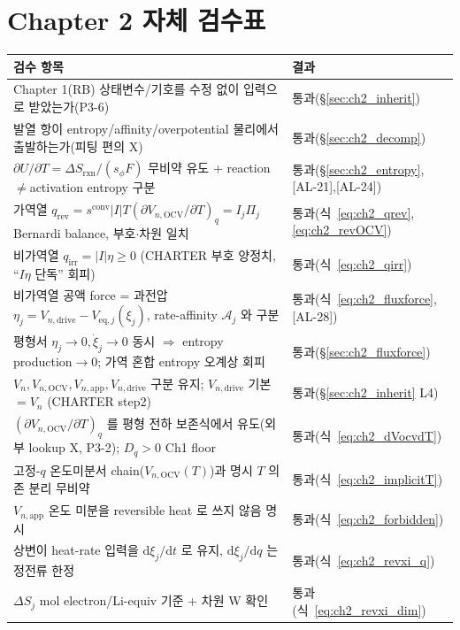 \documentclass[11pt,a4paper]{article}
\newcommand{\dd}{\mathrm{d}}
\newcommand{\eq}{\mathrm{eq}}
\newcommand{\app}{\mathrm{app}}
\newcommand{\drive}{\mathrm{drive}}
\newcommand{\OCV}{\mathrm{OCV}}
\newcommand{\irr}{\mathrm{irr}}
\newcommand{\rev}{\mathrm{rev}}
\newcommand{\rxn}{\mathrm{rxn}}
\newcommand{\conv}{\mathrm{conv}}
\newcommand{\AL}[1]{\textsf{[AL-#1]}}
\begin{document}
\section{Chapter 2 자체 검수표}\label{sec:ch2_selfcheck}
{\small
\begin{longtable}{p{} p{}}
\toprule 검수 항목 & 결과 \\ \midrule \endhead
Chapter 1(RB) 상태변수/기호를 수정 없이 입력으로 받았는가(P3-6) & 통과(\S\ref{sec:ch2_inherit}) \\
발열 항이 entropy/affinity/overpotential 물리에서 출발하는가(피팅 편의 X) & 통과(\S\ref{sec:ch2_decomp}) \\
$\partial U/\partial T=\Delta S_\rxn/(s_\phi F)$ 무비약 유도 + reaction$\ne$activation entropy 구분 & 통과(\S\ref{sec:ch2_entropy}, \AL{21},\AL{24}) \\
가역열 $q_\rev=s^\conv|I|T(\partial V_{n,\OCV}/\partial T)_q=I_j\Pi_j$ Bernardi balance, 부호$\cdot$차원 일치 & 통과(식~\eqref{eq:ch2_qrev},\eqref{eq:ch2_revOCV}) \\
비가역열 $q_\irr=|I|\eta\ge0$ (CHARTER 부호 양정치, ``$I\eta$ 단독'' 회피) & 통과(식~\eqref{eq:ch2_qirr}) \\
비가역열 공액 force = 과전압 $\eta_j=V_{n,\drive}-V_{\eq,j}(\xi_j)$, rate-affinity $\mathcal A_j$ 와 구분 & 통과(식~\eqref{eq:ch2_fluxforce}, \AL{28}) \\
평형서 $\eta_j\to0,\dot\xi_j\to0$ 동시 $\Rightarrow$ entropy production$\to0$; 가역 혼합 entropy 오계상 회피 & 통과(\S\ref{sec:ch2_fluxforce}) \\
$V_n,V_{n,\OCV},V_{n,\app},V_{n,\drive}$ 구분 유지; $V_{n,\drive}$ 기본 $=V_n$ (CHARTER step2) & 통과(\S\ref{sec:ch2_inherit} L4) \\
$(\partial V_{n,\OCV}/\partial T)_q$ 를 평형 전하 보존식에서 유도(외부 lookup X, P3-2); $D_q>0$ Ch1 floor & 통과(식~\eqref{eq:ch2_dVocvdT}) \\
고정-$q$ 온도미분서 chain($V_{n,\OCV}(T)$)과 명시 $T$ 의존 분리 무비약 & 통과(식~\eqref{eq:ch2_implicitT}) \\
$V_{n,\app}$ 온도 미분을 reversible heat 로 쓰지 않음 명시 & 통과(식~\eqref{eq:ch2_forbidden}) \\
상변이 heat-rate 입력을 $\dd\xi_j/\dd t$ 로 유지, $\dd\xi_j/\dd q$ 는 정전류 한정 & 통과(식~\eqref{eq:ch2_revxi_q}) \\
$\Delta S_j$ mol electron/Li-equiv 기준 + 차원 W 확인 & 통과(식~\eqref{eq:ch2_revxi_dim}) \\

\end{longtable}}
\end{document}
